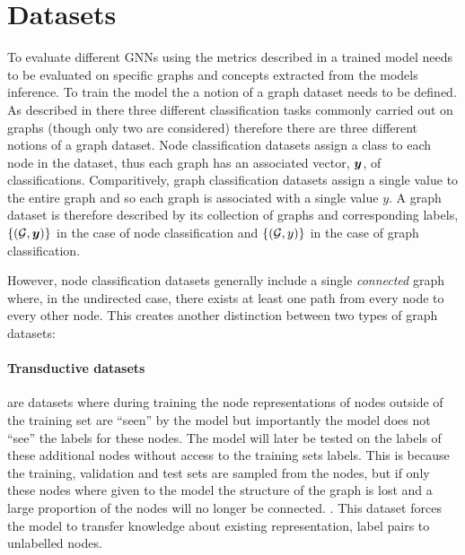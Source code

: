\section{Datasets}


To evaluate different GNNs using the metrics described in  a trained model needs to be evaluated on specific graphs and concepts extracted from the models inference.
To train the model the a notion of a graph dataset needs to be defined.
As described in  there three different classification tasks commonly carried out on graphs (though only two are considered) therefore there are three different notions of a graph dataset.
Node classification datasets assign a class to each node in the dataset, thus each graph has an associated vector, ${\bm{y}}$, of classifications.
Comparitively, graph classification datasets assign a single value to the entire graph and so each graph is associated with a single value $y$.
A graph dataset is therefore described by its collection of graphs and corresponding labels, $\{({\mathcal{G}}, {\bm{y}})\}$ in the case of node classification and $\{({\mathcal{G}}, y)\}$ in the case of graph classification.

However, node classification datasets generally include a single \emph{connected} graph where, in the undirected case, there exists at least one path from every node to every other node.
This creates another distinction between two types of graph datasets:

\paragraph{Transductive datasets} are datasets where during training the node representations of nodes outside of the training set are ``seen'' by the model but importantly the model does not ``see'' the labels for these nodes.
The model will later be tested on the labels of these additional nodes without access to the training sets labels.
This is because the training, validation and test sets are sampled from the nodes, but if only these nodes where given to the model the structure of the graph is lost and a large proportion of the nodes will no longer be connected.
.
This dataset forces the model to transfer knowledge about existing representation, label pairs to unlabelled nodes.

